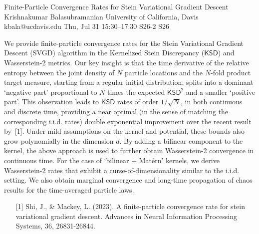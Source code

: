 \begin{talk}
  {Finite-Particle Convergence Rates for Stein Variational Gradient Descent}%
  {Krishnakumar Balasubramanian}%
  {University of California, Davis}%
  {kbala@ucdavis.edu}%
  {}%
  {}%
  {Thu, Jul 31 15:30–17:30}%
  {S26-2}%
  {S26}%
  {}%
  
				
			
 We provide finite-particle convergence rates for the Stein Variational Gradient Descent (SVGD) algorithm in the Kernelized Stein Discrepancy ($\mathsf{KSD}$) and Wasserstein-2 metrics. Our key insight is that the time derivative of the relative entropy between the joint density of $N$ particle locations and the $N$-fold product target measure, starting from a regular initial distribution, splits into a dominant `negative part' proportional to $N$ times the expected $\mathsf{KSD}^2$ and a smaller `positive part'. This observation leads to $\mathsf{KSD}$ rates of order $1/\sqrt{N}$, in both continuous and discrete time, providing a near optimal (in the sense of matching the corresponding i.i.d. rates) double exponential improvement over the recent result by~[1]. Under mild assumptions on the kernel and potential, these bounds also grow polynomially in the dimension $d$. By adding a bilinear component to the kernel, the above approach is used to further obtain Wasserstein-2 convergence in continuous time. For the case of `bilinear + Mat\'ern' kernels, we derive Wasserstein-2 rates that exhibit a curse-of-dimensionality similar to the i.i.d. setting. We also obtain marginal convergence and long-time propagation of chaos results for the time-averaged particle laws. 

\medskip


\begin{enumerate}
	\item[{[1]}] Shi, J., \& Mackey, L. (2023). A finite-particle convergence rate for stein variational gradient descent. Advances in Neural Information Processing Systems, 36, 26831-26844.
\end{enumerate}

\end{talk}

